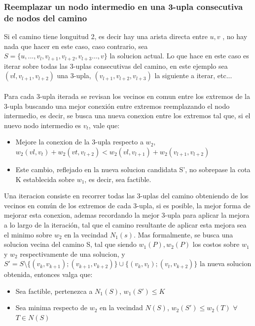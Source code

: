\subsubsection{Reemplazar un nodo intermedio en una 3-upla consecutiva de nodos del camino}
Si el camino tiene longuitud 2, es decir hay una arista directa entre $u,v$ , no hay nada que hacer en este caso, caso contrario, sea $S = \{u,...,v_l, v_{l+1}, v_{l+2}, v_{l+3} ..., v\}$ la solucion actual. Lo que hace en este caso es iterar sobre todas las 3-uplas consecutivas del camino, en este ejemplo sea $(vl, v_{l+1}, v_{l+2})$ una 3-upla, $(v_{l+1}, v_{l+2}, v_{l+3})$ la siguiente a iterar, etc...\\ \\
Para cada 3-upla iterada se revisan los vecinos en comun entre los extremos de la 3-upla buscando una mejor conexi\'on entre extremos reemplazando el nodo intermedio, es decir, se busca una nueva conexion entre los extremos tal que, si el nuevo nodo intermedio es $v_t$, vale que:
\begin{itemize}
	\item Mejore la conexion de la 3-upla respecto a $w_2$, $w_2(vl, v_{t}) + w_2(vt, v_{l+2}) < w_2(vl, v_{l+1}) + w_2(v_{l+1}, v_{l+2})$
	\item Este cambio, reflejado en la nueva solucion candidata S', no sobrepase la cota K establecida sobre $w_1$, es decir, sea factible.
\end{itemize}


Una iteracion consiste en recorrer todas las 3-uplas del camino obteniendo de los vecinos en com\'un de los extremos de cada 3-upla, si es posible, la mejor forma de mejorar esta conexion, ademas recordando la mejor 3-upla para aplicar la mejora a lo largo de la iteraci\'on, tal que el camino resultante de aplicar esta mejora sea el minimo sobre $w_2$ en la vecindad $N_1(s)$. Mas formalmente, se busca una solucion vecina del camino S, tal que siendo $w_1(P), w_2(P)$ los costos sobre $w_1$ y $w_2$ respectivamente de una solucion, y $S' = S \setminus \{(v_k, v_{k+1}); (v_{k+1}, v_{k+2})\} \cup \{(v_k, v_t);(v_t, v_{k+2})\}$ la nueva solucion obtenida, entonces valga que:
\begin{itemize}
	\item Sea factible, pertenezca a $N_1(S)$, $ w_1(S') \leq K$
	\item Sea minima respecto de $w_2$ en la vecindad $N(S)$, $w_2(S') \leq w_2(T)$ $ \forall$ $ T \in N(S) $
\end{itemize}

